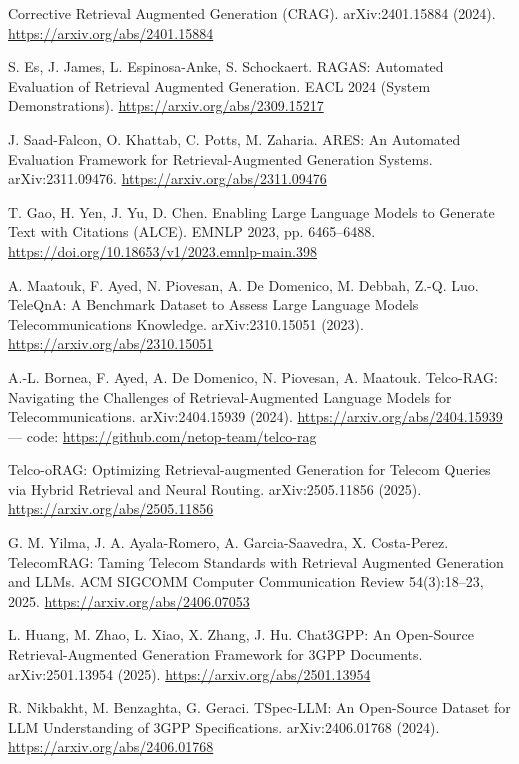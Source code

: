 \documentclass[11pt,a4paper]{article}
\begin{document}
\begin{description}[leftmargin=3.2em,labelwidth=2.8em,labelsep=0.4em,font=\normalfont,itemsep=3pt]
\item[{[10]}] \hypertarget{ref10}{}Corrective Retrieval Augmented Generation (CRAG). arXiv:2401.15884 (2024). \url{https://arxiv.org/abs/2401.15884}
\item[{[11]}] \hypertarget{ref11}{}S. Es, J. James, L. Espinosa-Anke, S. Schockaert. RAGAS: Automated Evaluation of Retrieval Augmented Generation. EACL 2024 (System Demonstrations). \url{https://arxiv.org/abs/2309.15217}
\item[{[12]}] \hypertarget{ref12}{}J. Saad-Falcon, O. Khattab, C. Potts, M. Zaharia. ARES: An Automated Evaluation Framework for Retrieval-Augmented Generation Systems. arXiv:2311.09476. \url{https://arxiv.org/abs/2311.09476}
\item[{[13]}] \hypertarget{ref13}{}T. Gao, H. Yen, J. Yu, D. Chen. Enabling Large Language Models to Generate Text with Citations (ALCE). EMNLP 2023, pp. 6465--6488. \url{https://doi.org/10.18653/v1/2023.emnlp-main.398}
\item[{[14]}] \hypertarget{ref14}{}A. Maatouk, F. Ayed, N. Piovesan, A. De Domenico, M. Debbah, Z.-Q. Luo. TeleQnA: A Benchmark Dataset to Assess Large Language Models Telecommunications Knowledge. arXiv:2310.15051 (2023). \url{https://arxiv.org/abs/2310.15051}
\item[{[15]}] \hypertarget{ref15}{}A.-L. Bornea, F. Ayed, A. De Domenico, N. Piovesan, A. Maatouk. Telco-RAG: Navigating the Challenges of Retrieval-Augmented Language Models for Telecommunications. arXiv:2404.15939 (2024). \url{https://arxiv.org/abs/2404.15939} --- code: \url{https://github.com/netop-team/telco-rag}
\item[{[16]}] \hypertarget{ref16}{}Telco-oRAG: Optimizing Retrieval-augmented Generation for Telecom Queries via Hybrid Retrieval and Neural Routing. arXiv:2505.11856 (2025). \url{https://arxiv.org/abs/2505.11856}
\item[{[17]}] \hypertarget{ref17}{}G. M. Yilma, J. A. Ayala-Romero, A. Garcia-Saavedra, X. Costa-Perez. TelecomRAG: Taming Telecom Standards with Retrieval Augmented Generation and LLMs. ACM SIGCOMM Computer Communication Review 54(3):18--23, 2025. \url{https://arxiv.org/abs/2406.07053}
\item[{[18]}] \hypertarget{ref18}{}L. Huang, M. Zhao, L. Xiao, X. Zhang, J. Hu. Chat3GPP: An Open-Source Retrieval-Augmented Generation Framework for 3GPP Documents. arXiv:2501.13954 (2025). \url{https://arxiv.org/abs/2501.13954}
\item[{[19]}] \hypertarget{ref19}{}R. Nikbakht, M. Benzaghta, G. Geraci. TSpec-LLM: An Open-Source Dataset for LLM Understanding of 3GPP Specifications. arXiv:2406.01768 (2024). \url{https://arxiv.org/abs/2406.01768}

\end{description}
\end{document}
